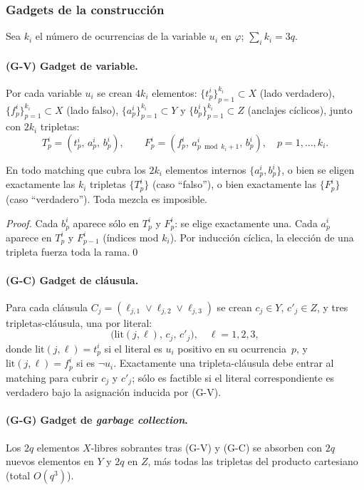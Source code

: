 \subsubsection{Gadgets de la construcción}
\label{sec:complejidad:gadgets}

Sea $k_i$ el número de ocurrencias de la variable $u_i$ en $\varphi$;
$\sum_i k_i = 3q$.

\paragraph{(G-V) Gadget de variable.}
Por cada variable $u_i$ se crean $4k_i$ elementos:
$\{t^i_p\}_{p=1}^{k_i}\subset X$ (lado verdadero),
$\{f^i_p\}_{p=1}^{k_i}\subset X$ (lado falso),
$\{a^i_p\}_{p=1}^{k_i}\subset Y$ y
$\{b^i_p\}_{p=1}^{k_i}\subset Z$ (anclajes cíclicos),
junto con $2k_i$ tripletas:
\[
T^i_p = (t^i_p,\,a^i_p,\,b^i_p),
\qquad
F^i_p = (f^i_p,\,a^i_{p\bmod k_i+1},\,b^i_p),
\quad p=1,\dots,k_i.
\]

\begin{lemma}
\label{lem:consistency}
En todo matching que cubra los $2k_i$ elementos internos
$\{a^i_p,b^i_p\}$, o bien se eligen exactamente las $k_i$
tripletas $\{T^i_p\}$ (caso ``falso''), o bien exactamente
las $\{F^i_p\}$ (caso ``verdadero'').  Toda mezcla es imposible.
\end{lemma}
\begin{proof}
Cada $b^i_p$ aparece sólo en $T^i_p$ y $F^i_p$: se elige exactamente una.
Cada $a^i_p$ aparece en $T^i_p$ y $F^i_{p-1}$ (índices mod $k_i$).
Por inducción cíclica, la elección de una tripleta fuerza toda la rama.\qed
\end{proof}

\paragraph{(G-C) Gadget de cláusula.}
Para cada cláusula $C_j = (\ell_{j,1}\vee\ell_{j,2}\vee\ell_{j,3})$ se
crean $c_j\in Y$, $c'_j\in Z$, y tres tripletas-cláusula, una por literal:
\[
\bigl(\mathrm{lit}(j,\ell),\,c_j,\,c'_j\bigr),\quad \ell=1,2,3,
\]
donde $\mathrm{lit}(j,\ell)=t^i_p$ si el literal es $u_i$ positivo en su
ocurrencia~$p$, y $\mathrm{lit}(j,\ell)=f^i_p$ si es $\neg u_i$.
Exactamente una tripleta-cláusula debe entrar al matching para cubrir
$c_j$ y $c'_j$; sólo es factible si el literal correspondiente es
verdadero bajo la asignación inducida por (G-V).

\paragraph{(G-G) Gadget de \textit{garbage collection}.}
Los $2q$ elementos $X$-libres sobrantes tras (G-V) y (G-C) se absorben
con $2q$ nuevos elementos en $Y$ y $2q$ en $Z$, más todas las tripletas
del producto cartesiano (total $O(q^3)$).

